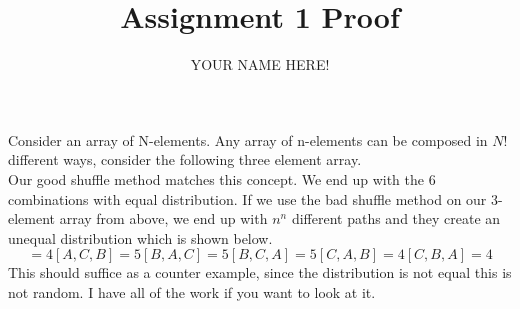 
\title{Assignment 1 Proof}

\author{YOUR NAME HERE!}



\maketitle

Consider an array of N-elements. Any array of n-elements can be composed in $N!$ different ways, consider the following three element array.
\begin{equation}
[A,B,C] [A,C,B] [B,A,C] [B,C,A] [C,A,B] [C,B,A]
\end{equation}
Our good shuffle method matches this concept. We end up with the 6 combinations with equal distribution. 
If we use the bad shuffle method on our 3-element array from above, we end up with $n^n$ different paths and they create an unequal distribution which is shown below.
\begin{equation}
[A,B,C] = 4 [A,C,B] = 5 [B,A,C] = 5 [B,C,A] = 5 [C,A,B] = 4 [C,B,A] = 4
\end{equation}
This should suffice as a counter example, since the distribution is not equal this is not random. I have all of the work if you want to look at it. 

